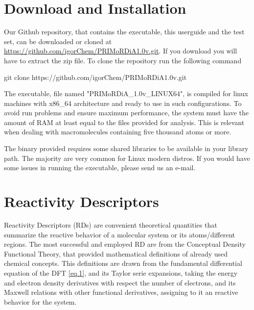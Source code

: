 \documentclass[a4paper,11pt]{refart}
\begin{document}
\section{Download and Installation}

Our Github repository, that contains the executable, this userguide and the test set, can be downloaded or cloned at \url{https://github.com/igorChem/PRIMoRDiA1.0v.git}. If you download you will have to extract the zip file. To clone the repository run the following command

\hspace*{-\leftmarginwidth}
\begin{minipage}{\fullwidth}
	\begin{commandshell}git clone https://github.com/igorChem/PRIMoRDiA1.0v.git\end{commandshell}
\end{minipage}

The executable, file named "PRIMoRDiA\_1.0v\_LINUX64", is compiled for linux machines with x86\_64 architecture and ready to use in such configurations. 
To avoid run problems and ensure maximum performance, the system must have the amount of RAM at least equal to the files provided for analysis. This is relevant when dealing with macromolecules containing five thousand atoms or more. 

The binary provided requires some shared libraries to be available in your library path. The majority are very common for Linux modern distros. If you would have some issues in running the executable, please send us an e-mail.

\section{Reactivity Descriptors}

Reactivity Descriptors (RDs) are convenient theoretical quantities that summarize the reactive behavior of a molecular system or its atoms/different regions. The most successful and employed RD are from the Conceptual Density Functional Theory, that provided mathematical definitions of already used chemical concepts\cite{geerlings2003conceptual}. This definitions are drawn from the fundamental differential equation of the DFT \autoref{eq.1}, and its Taylor serie expansions, taking the energy and electron density derivatives with respect the number of electrons, and its Maxwell relations with other functional derivatives, assigning to it an reactive behavior for the system\cite{parr1978elect}. 
\end{document}
